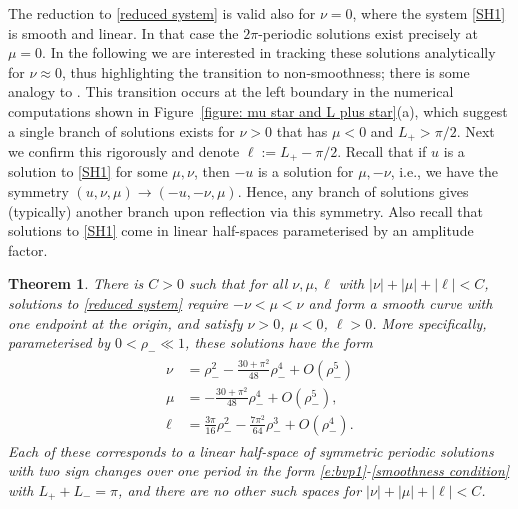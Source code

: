 \documentclass{article}
\numberwithin{equation}{section}
\newtheorem{theorem}{Theorem}[section]
\begin{document}
\medskip
The reduction to \eqref{reduced system} is valid also for $\nu=0$, where the system \eqref{SH1} is smooth and linear. In that case the $2\pi$-periodic solutions exist precisely at $\mu=0$. In the following we are interested in tracking these solutions analytically for $\nu\approx 0$, thus highlighting the transition to non-smoothness; there is some analogy to \cite{BettiniCenedeseHaller2024}. This transition occurs at the left boundary in the numerical computations shown in Figure~\ref{figure: mu star and L plus star}(a), which suggest a single branch of solutions exists for $\nu>0$ that has $\mu<0$ and $L_+>\pi/2$. 
		 Next we confirm this rigorously and denote $\ell:=L_+-\pi/2$. Recall that if $u$ is a solution to \eqref{SH1} for some $\mu,\nu$, then $-u$ is a solution for $\mu,-\nu$, i.e., we have the symmetry $(u,\nu,\mu) \to (-u,-\nu,\mu)$. Hence, any branch of solutions gives (typically) another branch upon reflection via this symmetry. Also recall that solutions to \eqref{SH1} come in linear half-spaces parameterised by an amplitude factor. 
		 \begin{theorem}\label{thm:smallnu}
		 	There is $C>0$ such that for all $\nu,\mu,\ell$ with $|\nu|+|\mu|+|\ell|< C$, solutions to \eqref{reduced system} require $-\nu<\mu<\nu$ and form a smooth curve with one endpoint at the origin, and satisfy $\nu>0$, $\mu<0$, $\ell>0$. More specifically, parameterised by $0<\rho_-\ll1$, these solutions have the form 
		 	\begin{align}\label{e:nu0bif}
		 		\begin{split}
		 			\nu &= \rho_-^2 - \frac{30+\pi^2}{48}\rho_-^4 + O(\rho_-^5)\\
		 			\mu &= - \frac{30+\pi^2}{48}\rho_-^4 + O(\rho_-^5),\\
		 			\ell &= \frac{3\pi}{16}\rho_-^2 - \frac{7\pi^2}{64}\rho_-^3 + O(\rho_-^4).
		 	\end{split}\end{align}
		 	Each of these corresponds to a linear half-space of symmetric periodic solutions with two sign changes over one period in the form \eqref{e:bvp1}-\eqref{smoothness condition} with $L_++L_-=\pi$, and there are no other such spaces for $|\nu|+|\mu|+|\ell| < C$.
		 \end{theorem}
\end{document}
